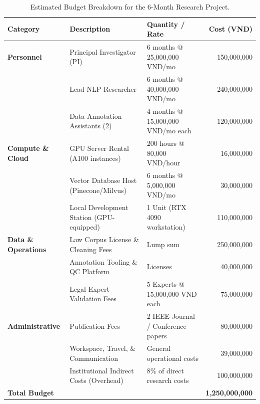 \begin{table}[H]
\centering
\caption{Estimated Budget Breakdown for the 6-Month Research Project.}
\label{tab:estimated_budget}
\begin{tabularx}{\textwidth}{lXXr}
\hline
\textbf{Category} & \textbf{Description} & \textbf{Quantity / Rate} & \textbf{Cost (VND)} \\
\hline
\textbf{Personnel} & Principal Investigator (PI) & 6 months @ 25,000,000 VND/mo & 150,000,000 \\
                   & Lead NLP Researcher & 6 months @ 40,000,000 VND/mo & 240,000,000 \\
                   & Data Annotation Assistants (2) & 4 months @ 15,000,000 VND/mo each & 120,000,000 \\
\hline
\textbf{Compute \& Cloud} & GPU Server Rental (A100 instances) & 200 hours @ 80,000 VND/hour & 16,000,000 \\
                         & Vector Database Host (Pinecone/Milvus) & 6 months @ 5,000,000 VND/mo & 30,000,000 \\
                         & Local Development Station (GPU-equipped) & 1 Unit (RTX 4090 workstation) & 110,000,000 \\
\hline
\textbf{Data \& Operations} & Law Corpus License \& Cleaning Fees & Lump sum & 250,000,000 \\
                            & Annotation Tooling \& QC Platform & Licenses & 40,000,000 \\
                            & Legal Expert Validation Fees & 5 Experts @ 15,000,000 VND each & 75,000,000 \\
\hline
\textbf{Administrative} & Publication Fees & 2 IEEE Journal / Conference papers & 80,000,000 \\
                        & Workspace, Travel, \& Communication & General operational costs & 39,000,000 \\
                        & Institutional Indirect Costs (Overhead) & 8\% of direct research costs & 100,000,000 \\
\hline
\textbf{Total Budget} & & & \textbf{1,250,000,000} \\
\hline
\end{tabularx}
\end{table}
